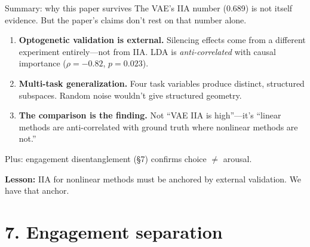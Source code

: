 \documentclass[aspectratio=169,11pt]{beamer}
\begin{document}
\begin{frame}{Summary: why this paper survives}
\vspace{-0.3em}
The VAE's IIA number (0.689) is not itself evidence. But the paper's claims don't rest on that number alone.
\vspace{0.3em}
\begin{enumerate}
  \item \textbf{Optogenetic validation is external.} Silencing effects come from a different experiment entirely---not from IIA. LDA is \emph{anti-correlated} with causal importance ($\rho = -0.82$, $p = 0.023$).
  \item \textbf{Multi-task generalization.} Four task variables produce distinct, structured subspaces. Random noise wouldn't give structured geometry.
  \item \textbf{The comparison is the finding.} Not ``VAE IIA is high''---it's ``linear methods are anti-correlated with ground truth where nonlinear methods are not.''
\end{enumerate}
\vspace{0.3em}
{\small Plus: engagement disentanglement (\S7) confirms choice $\neq$ arousal.}

\vspace{0.3em}
\textbf{Lesson:} IIA for nonlinear methods must be anchored by external validation. We have that anchor.
\end{frame}

\section{7. Engagement separation}\hypertarget{sec:7}{}
\end{document}
